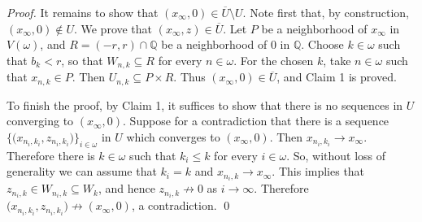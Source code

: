 \documentclass[10pt,a4paper]{amsart}
\newcommand{\SM}{{\setminus}}
\newcommand{\w}{\omega}
\begin{document}
\begin{proof}
It remains to show that $(x_\infty,0)\in \overline{U}\SM U$. Note first that, by construction,  $(x_\infty,0)\not\in U$. We prove that  $(x_\infty,z)\in \overline{U}$. Let $P$ be a neighborhood of $x_\infty$ in $V(\w)$, and $R=(-r,r)\cap \mathbb{Q}$ be a neighborhood of $0$ in $\mathbb{Q}$. Choose $k\in\w$  such that $b_k<r$, so that $W_{n,k}\subseteq R$ for every $n\in\w$. For the chosen $k$, take $n\in\w$ such that $x_{n,k}\in P$. Then $U_{n,k}\subseteq P\times R$. Thus  $(x_\infty,0)\in \overline{U}$, and Claim 1 is proved.
\smallskip

To finish the proof, by Claim 1, it suffices to show that there is no sequences in $U$ converging to $(x_\infty,0)$. Suppose for a contradiction that there is a sequence $\big\{ \big(x_{n_i,k_i},z_{n_i,k_i}\big)\big\}_{i\in\w}$ in $U$ which converges to  $(x_\infty,0)$. Then $x_{n_i,k_i}\to x_\infty$. Therefore there is $k\in\w$ such that $k_i\leq k$ for every $i\in\w$. So, without loss of generality we can assume that $k_i=k$ and $x_{n_i,k}\to x_\infty$. This implies that $z_{n_i,k}\in W_{n_i,k} \subseteq W_k$, and hence  $z_{n_i,k}\not\to 0$ as $i\to\infty$. Therefore $\big(x_{n_i,k_i},z_{n_i,k_i}\big)\not\to (x_\infty,0)$, a contradiction. \qed
\end{proof}
\end{document}
